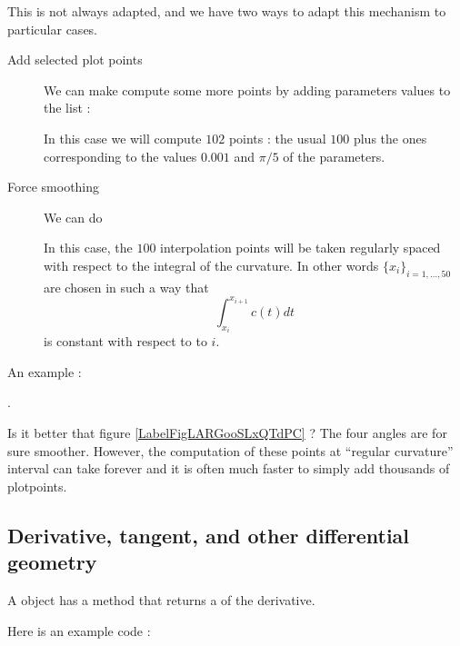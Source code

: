 This is not always adapted, and we have two ways to adapt this mechanism to particular cases.
\begin{description}
    \item[Add selected plot points] We can make compute some more points by adding parameters values to the list  :
        
        In this case we will compute \( 102\) points : the usual \( 100\) plus the ones corresponding to the values \( 0.001 \) and \( \pi/5\) of the parameters.

    \item[Force smoothing]
            We can do
        
        In this case, the \( 100\) interpolation points will be taken regularly spaced with respect to the integral of the curvature. In other words \( \{ x_i \}_{i=1,\ldots, 50}\) are chosen in such a way that
        \begin{equation}
            \int_{x_i}^{x_{i+1}}c(t)dt
        \end{equation}
        is constant with respect to to \( i\).

\end{description}

An example :

.

\begin{center}
   
\end{center}
Is it better that figure \ref{LabelFigLARGooSLxQTdPC} ? The four angles are for sure smoother. However, the computation of these points at ``regular curvature'' interval can take forever and it is often much faster to simply add thousands of plotpoints.

\subsection{Derivative, tangent, and other differential geometry}

A  object has a method  that returns a  of the derivative.

Here is an example code :



